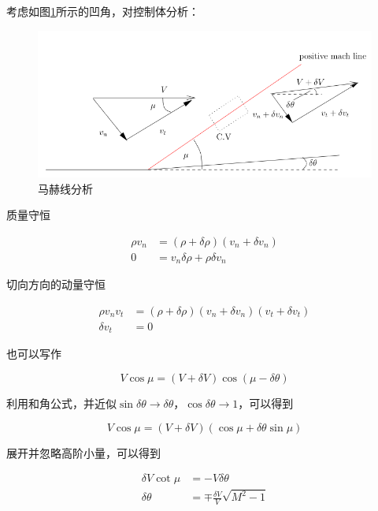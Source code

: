 考虑如图\ref{14}所示的凹角，对控制体分析：

\begin{figure}[!ht]
    \centering
    \includegraphics[width=\linewidth]{figures/14.png}
    \caption{马赫线分析}
    \label{14}
\end{figure}

质量守恒

\begin{align*}
    \rho v_n&=(\rho+\delta\rho)(v_n+\delta v_n)\\ 
    0&=v_n\delta\rho+\rho\delta v_n
\end{align*}

切向方向的动量守恒

\begin{align*}
    \rho v_{n} v_{t}&=(\rho+\delta \rho)\left(v_{n}+\delta v_{n}\right)\left(v_{t}+\delta v_{t}\right)\\ 
    \delta v_{t}&=0
\end{align*}

也可以写作

\begin{equation*}
    V\cos\mu=(V+\delta V)\cos(\mu-\delta\theta)
\end{equation*}

利用和角公式，并近似$\sin\delta\theta\rightarrow\delta\theta$，$\cos\delta\theta\rightarrow1$，可以得到

\begin{equation*}
    V \cos \mu=(V+\delta V)(\cos \mu+\delta \theta \sin \mu)
\end{equation*}

展开并忽略高阶小量，可以得到

\begin{align*}
    \delta V \cot \mu&=-V \delta \theta\\ 
    \delta \theta&=\mp \frac{\delta V}{V} \sqrt{M^{2}-1}
\end{align*}


